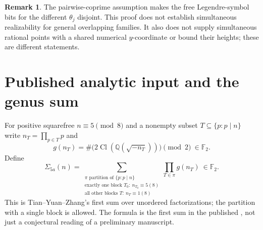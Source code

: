 \documentclass[11pt,a4paper]{article}
\theoremstyle{definition}
\newtheorem{remark}[theorem]{Remark}
\newcommand{\FF}{\mathbb F_2}
\newcommand{\QQ}{\mathbb Q}
\begin{document}
\begin{remark}\label{rem:scope}
The pairwise-coprime assumption makes the free Legendre-symbol bits
for the different $\theta_j$ disjoint.  This proof does not establish
simultaneous realizability for general overlapping families.  It also does
not supply simultaneous rational points with a shared numerical
$y$-coordinate or bound their heights; these are different statements.
\end{remark}

\section{Published analytic input and the genus sum}\label{sec:published}

For positive squarefree $n\equiv5\pmod8$ and a nonempty subset
$T\subseteq\{p:p\mid n\}$ write $n_T=\prod_{p\in T}p$ and
\[
 g(n_T)=\#\bigl(2\operatorname{Cl}(\QQ(\sqrt{-n_T}))\bigr)
                                \pmod2\ \in\FF.
\]
Define
\begin{equation}\label{eq:genus}
 \Sigma_{5a}(n)=
    \sum_{\substack{\pi\text{ partition of }\{p:p\mid n\}\\
           \text{exactly one block }T_0:\ n_{T_0}\equiv5(8)\\
           \text{all other blocks }T:\ n_T\equiv1(8)}}
        \prod_{T\in\pi}g(n_T)\ \in\FF.
\end{equation}
This is Tian--Yuan--Zhang's first sum over unordered factorizations;
the partition with a single block is allowed.  The formula is the
first sum in the published \cite[Theorem~1.4]{TYZ}, not just a
conjectural reading of a preliminary manuscript.
\end{document}
